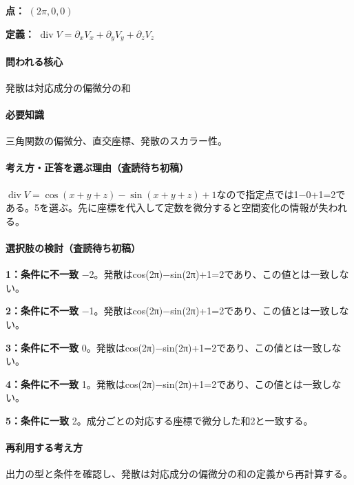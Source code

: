 \noindent\textbf{点：} \((2\pi,0,0)\)\par

\noindent\textbf{定義：} \(\operatorname{div}V=\partial_xV_x+\partial_yV_y+\partial_zV_z\)\par

\paragraph{問われる核心} 発散は対応成分の偏微分の和

\paragraph{必要知識} 三角関数の偏微分、直交座標、発散のスカラー性。

\paragraph{考え方・正答を選ぶ理由（査読待ち初稿）} \(\operatorname{div}V=\cos(x+y+z)-\sin(x+y+z)+1\)なので指定点では1−0+1=\allowbreak{}2である。5を選ぶ。先に座標を代入して定数を微分すると空間変化の情報が失われる。

\paragraph{選択肢の検討（査読待ち初稿）}\mbox{}\par

\noindent\textbf{1：条件に不一致} −2。発散はcos(2π)−sin(2π)+1=\allowbreak{}2であり、この値とは一致しない。\par

\noindent\textbf{2：条件に不一致} −1。発散はcos(2π)−sin(2π)+1=\allowbreak{}2であり、この値とは一致しない。\par

\noindent\textbf{3：条件に不一致} 0。発散はcos(2π)−sin(2π)+1=\allowbreak{}2であり、この値とは一致しない。\par

\noindent\textbf{4：条件に不一致} 1。発散はcos(2π)−sin(2π)+1=\allowbreak{}2であり、この値とは一致しない。\par

\noindent\textbf{5：条件に一致} 2。成分ごとの対応する座標で微分した和2と一致する。\par

\paragraph{再利用する考え方} 出力の型と条件を確認し、発散は対応成分の偏微分の和の定義から再計算する。

